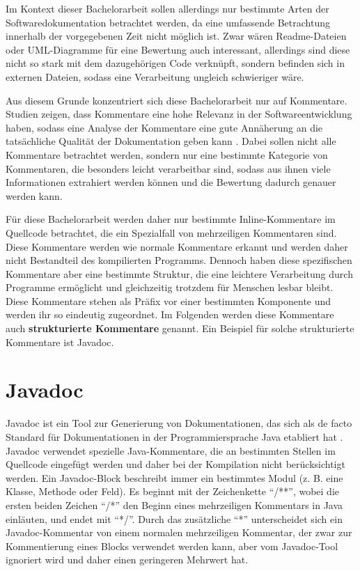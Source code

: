 Im Kontext dieser Bachelorarbeit sollen allerdings nur bestimmte Arten der Softwaredokumentation betrachtet werden, da eine umfassende Betrachtung innerhalb der vorgegebenen Zeit nicht möglich ist.  Zwar wären Readme-Dateien oder UML-Diagramme für eine Bewertung auch interessant, allerdings sind diese nicht so stark mit dem dazugehörigen Code verknüpft, sondern befinden sich in externen Dateien, sodass eine Verarbeitung ungleich schwieriger wäre.

Aus diesem Grunde konzentriert sich diese Bachelorarbeit nur auf Kommentare. Studien zeigen, dass Kommentare eine hohe Relevanz in der Softwareentwicklung haben, sodass eine Analyse der Kommentare eine gute Annäherung an die tatsächliche Qualität der Dokumentation geben kann \cite[S.~71]{AStudyoftheDocumentationEssentialtoSoftwareMaintenance}. Dabei sollen nicht alle Kommentare betrachtet werden, sondern nur eine bestimmte Kategorie von Kommentaren, die besonders leicht verarbeitbar sind, sodass aus ihnen viele Informationen extrahiert werden können und die Bewertung dadurch genauer werden kann. 

Für diese Bachelorarbeit werden daher nur bestimmte Inline-Kommentare im Quellcode betrachtet, die ein Spezialfall von mehrzeiligen Kommentaren sind.
Diese Kommentare werden wie normale Kommentare erkannt und werden daher nicht Bestandteil des kompilierten Programms. Dennoch haben diese spezifischen Kommentare aber eine bestimmte Struktur, die eine leichtere Verarbeitung durch Programme ermöglicht und gleichzeitig trotzdem für Menschen lesbar bleibt. Diese Kommentare stehen als Präfix vor einer bestimmten Komponente und werden ihr so eindeutig zugeordnet. Im Folgenden werden diese Kommentare auch \textbf{strukturierte Kommentare} genannt. Ein Beispiel für solche strukturierte Kommentare ist Javadoc. 







\section{Javadoc}\label{chapter:javadoc}
Javadoc \cite{HowtoWriteDocCommentsfortheJavadocTool} ist ein Tool zur Generierung von Dokumentationen, das sich als de facto Standard für Dokumentationen in der Programmiersprache Java etabliert hat \cite[S.~249]{JavadocViolationsandTheirEvolutioninOpen-SourceSoftware}.  Javadoc verwendet spezielle Java-Kommentare, die an bestimmten Stellen im Quellcode eingefügt werden und daher bei der Kompilation nicht berücksichtigt werden. Ein Javadoc-Block beschreibt immer ein bestimmtes Modul (z. B. eine Klasse, Methode oder Feld). Es beginnt mit der Zeichenkette \enquote{/**}, wobei die ersten beiden Zeichen \enquote{/*} den Beginn eines mehrzeiligen Kommentars in Java einläuten, und endet mit \enquote{*/}. Durch das zusätzliche \enquote{*} unterscheidet sich ein Javadoc-Kommentar von einem normalen mehrzeiligen Kommentar, der zwar zur Kommentierung eines Blocks verwendet werden kann, aber vom Javadoc-Tool ignoriert wird und daher einen geringeren Mehrwert hat. 


